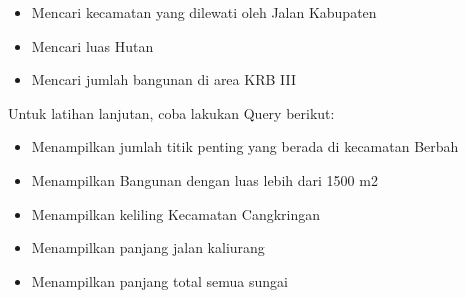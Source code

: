 \documentclass[letterpaper,10pt,english]{sphinxmanual}
\begin{document}
\begin{itemize}

\item {} 
Mencari kecamatan yang dilewati oleh Jalan Kabupaten

\begin{sphinxVerbatim}[commandchars=\\\{\}]
  
   
 
     
  
 
\end{sphinxVerbatim}


\item {} 
Mencari luas Hutan

\begin{sphinxVerbatim}[commandchars=\\\{\}]
      
 
\end{sphinxVerbatim}


\item {} 
Mencari jumlah bangunan di area KRB III

\begin{sphinxVerbatim}[commandchars=\\\{\}]
      
   
\end{sphinxVerbatim}


\end{itemize}

Untuk latihan lanjutan, coba lakukan Query berikut:
\begin{itemize}
\item {} 
Menampilkan jumlah titik penting yang berada di kecamatan Berbah

\item {} 
Menampilkan Bangunan dengan luas lebih dari 1500 m2

\item {} 
Menampilkan keliling Kecamatan Cangkringan

\item {} 
Menampilkan panjang jalan kaliurang

\item {} 
Menampilkan panjang total semua sungai

\end{itemize}
\end{document}
